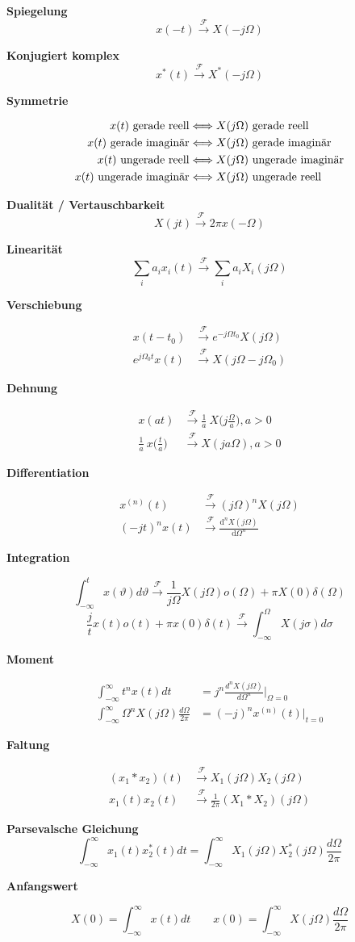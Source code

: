 \documentclass[10pt,a4paper]{article}
\newcommand{\fancyformula}[2]{
	\small
	\raggedright\sffamily\textbf{#1}
	#2
}
\newcommand{\ftransform}{
	\xrightarrow{~\mathcal{F}~}
}
\begin{document}
\begin{multicols}{2}
	
\fancyformula{Spiegelung}{\[ x(-t)\ftransform X(-j\Omega) \]}
\fancyformula{Konjugiert komplex}{\[ x^*(t) \ftransform X^*(-j\Omega)\]}
\fancyformula{Symmetrie}{
\begin{align*}
	x(t) \textnormal{ gerade reell} &\Longleftrightarrow X(j\Omega) \textnormal{ gerade reell} \\
	x(t) \textnormal{ gerade imaginär} &\Longleftrightarrow X(j\Omega) \textnormal{ gerade imaginär} \\
	x(t) \textnormal{ ungerade reell} &\Longleftrightarrow X(j\Omega) \textnormal{ ungerade imaginär} \\
	x(t) \textnormal{ ungerade imaginär} &\Longleftrightarrow X(j\Omega) \textnormal{ ungerade reell} \\
\end{align*}
}
\fancyformula{Dualität / Vertauschbarkeit}{\[ X(jt)\ftransform 2\pi x(-\Omega) \]}
\fancyformula{Linearität}{\[ \sum_{i} a_i x_i(t) \ftransform \sum_{i} a_i X_i(j\Omega)\]}
\fancyformula{Verschiebung}{
\begin{align*}
	x(t-t_0) &\ftransform e^{-j\Omega t_0}X(j\Omega) \\
	e^{j\Omega_0t}x(t) &\ftransform X(j\Omega-j\Omega_0)
\end{align*}
}
\fancyformula{Dehnung}{
\begin{align*}
	x(at) &\ftransform \frac{1}{a}~X\bigg(j\frac{\Omega}{a}\bigg), a>0 \\
	\frac{1}{a}~x\bigg(\frac{t}{a}\bigg) &\ftransform X(ja\Omega), a>0
\end{align*}
}
\fancyformula{Differentiation}{
\begin{align*}
	x^{(n)}(t) &\ftransform (j\Omega)^nX(j\Omega) \\
	(-jt)^nx(t) &\ftransform \frac{\mathrm d^n X(j\Omega)}{\mathrm d\Omega^n}
\end{align*}	
}
\fancyformula{Integration}{
	\[\int_{-\infty}^{t}x(\vartheta)d\vartheta \ftransform \frac{1}{j\Omega} X(j\Omega) o(\Omega)+\pi X(0)\delta(\Omega)\]
	\[\frac{j}{t}x(t)o(t)+\pi x(0) \delta(t)  \ftransform \int_{-\infty}^{\Omega}X(j\sigma)d\sigma \]
}
\fancyformula{Moment}{
\begin{align*}
	\int_{-\infty}^{\infty}t^n x(t)dt &= j^n \frac{d^nX(j\Omega)}{d\Omega^n} \bigg|_{\Omega=0} \\
	\int_{-\infty}^{\infty}\Omega^n X(j\Omega)\frac{d\Omega}{2\pi}&=(-j)^n x^{(n)}(t) \bigg|_{t=0}
\end{align*}	
}
\fancyformula{Faltung}{
\begin{align*}
	(x_1 \ast x_2)(t) &\ftransform X_1(j\Omega)X_2(j\Omega)\\
	x_1(t)x_2(t) &\ftransform \frac{1}{2\pi} (X_1 \ast X_2)(j\Omega)
\end{align*}
}
\fancyformula{Parsevalsche Gleichung}{\[ \int_{-\infty}^{\infty}x_1(t)x_2^*(t)dt=\int_{-\infty}^{\infty}X_1(j\Omega)X_2^*(j\Omega)\frac{d\Omega}{2\pi} \]}
\fancyformula{Anfangswert}{
	\[ X(0)=\int_{-\infty}^{\infty}x(t)dt\qquad x(0)=\int_{-\infty}^{\infty}X(j\Omega)\frac{d\Omega}{2\pi} \]	
}
\end{multicols}
\newpage
\end{document}
